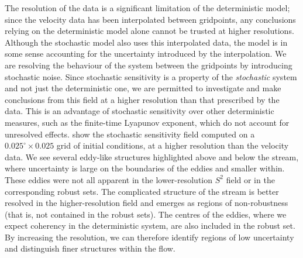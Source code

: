The resolution of the data is a significant limitation of the deterministic model; since the velocity data has been interpolated between gridpoints, any conclusions relying on the deterministic model alone cannot be trusted at higher resolutions.
Although the stochastic model also uses this interpolated data, the model is in some sense accounting for the uncertainty introduced by the interpolation.
We are resolving the behaviour of the system between the gridpoints by introducing stochastic noise.
Since stochastic sensitivity is a property of the \emph{stochastic} system and not just the deterministic one, we are permitted to investigate and make conclusions from this field at a higher resolution than that prescribed by the data.
This is an advantage of stochastic sensitivity over other deterministic measures, such as the finite-time Lyapunov exponent, which do not account for unresolved effects.
 show the stochastic sensitivity field computed on a \(0.025^\circ\times 0.025\) grid of initial conditions, at a higher resolution than the velocity data.
We see several eddy-like structures highlighted above and below the stream, where uncertainty is large on the boundaries of the eddies and smaller within.
These eddies were not all apparent in the lower-resolution \(S^2\) field or in the corresponding robust sets.
The complicated structure of the stream is better resolved in the higher-resolution field and emerges as regions of non-robustness (that is, not contained in the robust sets).
The centres of the eddies, where we expect coherency in the deterministic system, are also included in the robust set.
By increasing the resolution, we can therefore identify regions of low uncertainty and distinguish finer structures within the flow.





